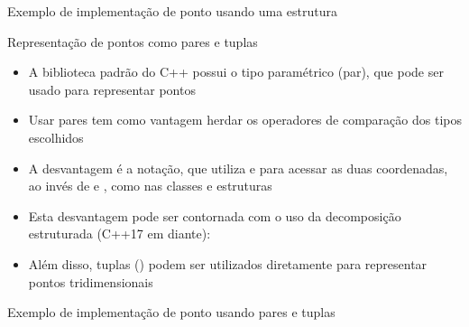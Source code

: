 \begin{frame}[fragile]{Exemplo de implementação de ponto usando uma estrutura}


\end{frame}


\begin{frame}[fragile]{Representação de pontos como pares e tuplas}

    \begin{itemize}
        \item A biblioteca padrão do C++ possui o tipo paramétrico  (par), que pode
            ser usado para representar pontos
        \pause

        \item Usar pares tem como vantagem herdar os operadores de comparação dos
            tipos escolhidos
        \pause

        \item A desvantagem é a notação, que utiliza  e  para
            acessar as duas coordenadas, ao invés de  e , como nas classes e
estruturas 
        \pause

        \item Esta desvantagem pode ser contornada com o uso da decomposição estruturada (C++17 em diante):

        \vspace{0.05in}
        \pause

        \item Além disso, tuplas () podem ser utilizados diretamente para representar pontos tridimensionais
    \end{itemize}

\end{frame}

\begin{frame}[fragile]{Exemplo de implementação de ponto usando pares e tuplas}
\end{frame}

